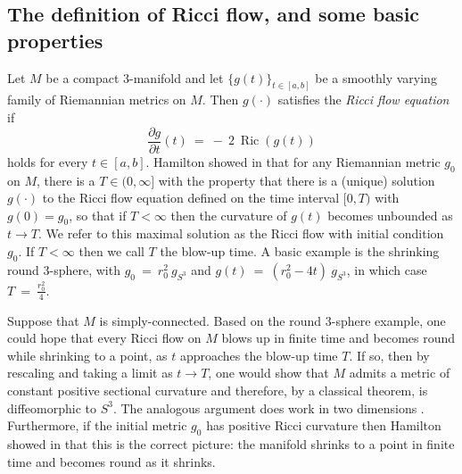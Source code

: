 \documentclass[12pt]{amsart}
\newcommand{\D}{\partial}
\newcommand{\Ric}{\operatorname{Ric}}
\newcommand{\ra}{\rightarrow}
\numberwithin{equation}{section}
\theoremstyle{plain}
\theoremstyle{definition}
\theoremstyle{remark}
\begin{document}
\subsection{The definition of Ricci flow, and some basic properties}


Let $M$ be a compact  $3$-manifold and let $\{g(t)\}_{t\in [a,b]}$
be a smoothly varying family of  Riemannian metrics on $M$.
Then $g(\cdot)$ satisfies the {\em Ricci flow equation} if 
\begin{equation}
\frac{\D g}{\D t}(t) \: = \:
- \: 2 \: \Ric(g(t))
\end{equation}
holds for every $t\in[a,b]$.
Hamilton showed in \cite{Hamiltonnnnn} that
for any Riemannian metric $g_0$ on $M$, there is a $T\in (0,\infty]$
with the property that there is a (unique) solution $g(\cdot)$
to the Ricci flow equation defined on the time interval $[0,T)$ with
$g(0) = g_0$, so
that if $T<\infty$ then the curvature of $g(t)$ becomes unbounded
as $t\ra T$.  We refer to this maximal solution as the Ricci flow with
initial condition $g_0$. If $T<\infty$ then we call $T$ the blow-up
time.  A basic example 
is the shrinking  round $3$-sphere, with $g_0 \: = \: r_0^2 \: g_{S^3}$ and
$g(t) \: = \: (r_0^2 - 4t) \:  g_{S^3}$, in which case $T \: = \: \frac{r_0^2}{4}$.

Suppose that $M$ is simply-connected.
Based on the round $3$-sphere example, one could hope that every Ricci flow  
on $M$ blows up in finite time and becomes round while shrinking to a  point,
as $t$ approaches the blow-up time $T$. If so, then
by rescaling and taking a limit as $t \rightarrow T$, one would show
that $M$ admits a metric of constant positive sectional curvature and 
therefore,
by a classical theorem, is diffeomorphic to $S^3$. The analogous argument does work
in two dimensions \cite[Chapter 5]{Chow-Knopf}. Furthermore, if the initial 
metric $g_0$
 has positive Ricci curvature then Hamilton
showed in \cite{Hamilton} that this is the correct picture:
the manifold shrinks to a point in finite time and becomes round
as it shrinks.
\end{document}
